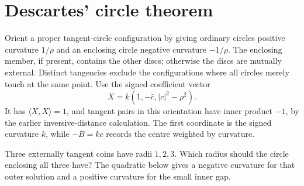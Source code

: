 \section{Descartes' circle theorem}

Orient a proper tangent-circle configuration by giving ordinary circles positive curvature $1/\rho$ and an enclosing circle negative curvature $-1/\rho$. The enclosing member, if present, contains the other discs; otherwise the discs are mutually external. Distinct tangencies exclude the configurations where all circles merely touch at the same point. Use the signed coefficient vector
\[
X=k(1,-\bar c,|c|^2-\rho^2).
\]
It has $\langle X,X\rangle=1$, and tangent pairs in this orientation have inner product $-1$, by the earlier inversive-distance calculation. The first coordinate is the signed curvature $k$, while $-\bar B=kc$ records the centre weighted by curvature.

\begin{think}
Three externally tangent coins have radii $1,2,3$. Which radius should the circle enclosing all three have? The quadratic below gives a negative curvature for that outer solution and a positive curvature for the small inner gap.
\end{think}

